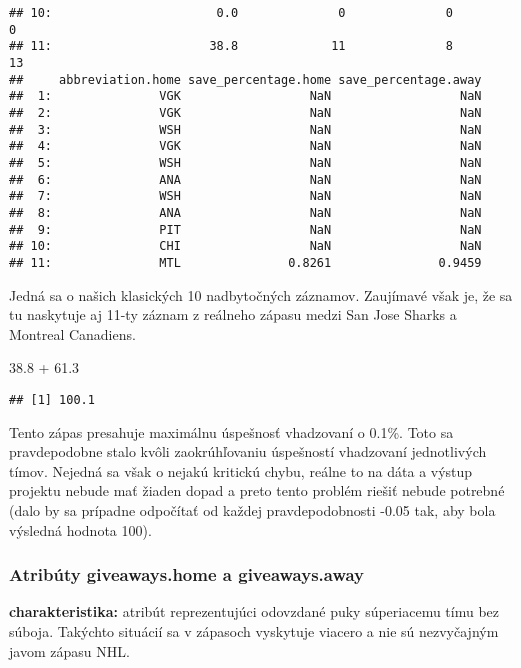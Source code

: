 \documentclass[
]{article}
\newenvironment{Shaded}{\begin{snugshade}}{\end{snugshade}}
\newcommand{\FloatTok}[1]{\textcolor[rgb]{0.00,0.00,0.81}{#1}}
\newcommand{\SpecialCharTok}[1]{\textcolor[rgb]{0.00,0.00,0.00}{#1}}
\begin{document}
\begin{verbatim}
## 10:                       0.0              0              0            0
## 11:                      38.8             11              8           13
##     abbreviation.home save_percentage.home save_percentage.away
##  1:               VGK                  NaN                  NaN
##  2:               VGK                  NaN                  NaN
##  3:               WSH                  NaN                  NaN
##  4:               VGK                  NaN                  NaN
##  5:               WSH                  NaN                  NaN
##  6:               ANA                  NaN                  NaN
##  7:               WSH                  NaN                  NaN
##  8:               ANA                  NaN                  NaN
##  9:               PIT                  NaN                  NaN
## 10:               CHI                  NaN                  NaN
## 11:               MTL               0.8261               0.9459
\end{verbatim}

Jedná sa o našich klasických 10 nadbytočných záznamov. Zaujímavé však
je, že sa tu naskytuje aj 11-ty záznam z reálneho zápasu medzi San Jose
Sharks a Montreal Canadiens.

\begin{Shaded}
\begin{Highlighting}[]
\FloatTok{38.8} \SpecialCharTok{+} \FloatTok{61.3}
\end{Highlighting}
\end{Shaded}

\begin{verbatim}
## [1] 100.1
\end{verbatim}

Tento zápas presahuje maximálnu úspešnosť vhadzovaní o 0.1\%. Toto sa
pravdepodobne stalo kvôli zaokrúhľovaniu úspešností vhadzovaní
jednotlivých tímov. Nejedná sa však o nejakú kritickú chybu, reálne to
na dáta a výstup projektu nebude mať žiaden dopad a preto tento problém
riešiť nebude potrebné (dalo by sa prípadne odpočítať od každej
pravdepodobnosti -0.05 tak, aby bola výsledná hodnota 100).

\hypertarget{atribuxfaty-giveaways.home-a-giveaways.away}{%
\subsubsection{Atribúty giveaways.home a
giveaways.away}\label{atribuxfaty-giveaways.home-a-giveaways.away}}

\textbf{charakteristika:} atribút reprezentujúci odovzdané puky
súperiacemu tímu bez súboja. Takýchto situácií sa v zápasoch vyskytuje
viacero a nie sú nezvyčajným javom zápasu NHL.
\end{document}
